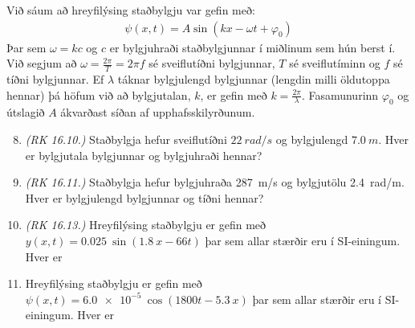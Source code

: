 \ifdefined \wholebook \else\documentclass[oneside]{book}\usepackage{EdlBook}\graphicspath{{figures/}}
\begin{document}
\begin{tcolorbox}
Við sáum að hreyfilýsing staðbylgju var gefin með:
\begin{align*}
    \psi(x,t) = A\sin(kx - \omega t + \varphi_0)
\end{align*}
Þar sem $\omega = kc$ og $c$ er bylgjuhraði staðbylgjunnar í miðlinum sem hún berst í. Við segjum að $\omega = \frac{2\pi}{T} = 2\pi f$ sé sveiflutíðni bylgjunnar, $T$ sé sveiflutíminn og $f$ sé tíðni bylgjunnar. Ef $\lambda$ táknar bylgjulengd bylgjunnar (lengdin milli öldutoppa hennar) þá höfum við að bylgjutalan, $k$, er gefin með $k = \frac{2\pi}{\lambda}$. Fasamunurinn $\varphi_0$ og útslagið $A$ ákvarðast síðan af upphafsskilyrðunum.
\end{tcolorbox}

\begin{enumerate}[label = \textbf{Dæmi \thechapter.\arabic*.}]

\setcounter{enumi}{7}

\item \textit{(RK 16.10.)} Staðbylgja hefur sveiflutíðni $\SI{22}{rad/s}$ og bylgjulengd $\SI{7.0}{m}$. Hver er bylgjutala bylgjunnar og bylgjuhraði hennar?

\item \textit{(RK 16.11.)} Staðbylgja hefur bylgjuhraða \SI{287}{m/s} og bylgjutölu \SI{2.4}{rad/m}. Hver er bylgjulengd bylgjunnar og tíðni hennar?

\item \textit{(RK 16.13.)} Hreyfilýsing staðbylgju er gefin með $y(x,t) = \SI{0.025}{}\sin(\SI{1.8}{}x-66t)$ þar sem allar stærðir eru í SI-einingum. Hver er 

\item Hreyfilýsing staðbylgju er gefin með $\psi(x,t) = \SI{6.0e-5}{}\cos( 1800 t - \SI{5.3}{}x)$ þar sem allar stærðir eru í SI-einingum. Hver er 


\end{enumerate}
\end{document}
